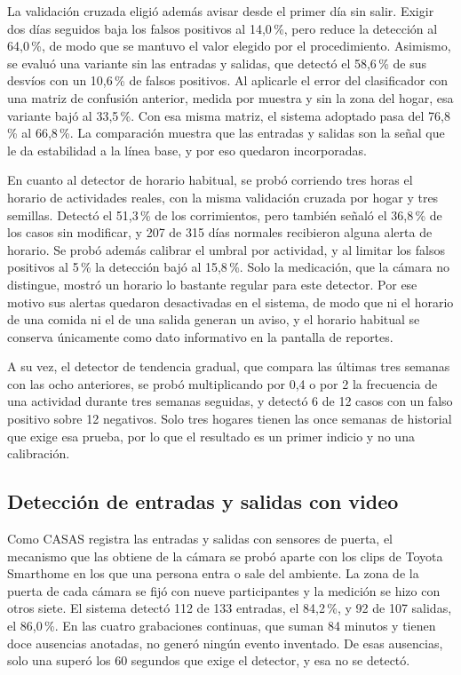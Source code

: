 La validación cruzada eligió además avisar desde el primer día sin salir.
Exigir dos días seguidos baja los falsos positivos al 14,0\,\%, pero reduce la detección al 64,0\,\%, de modo que se mantuvo el valor elegido por el procedimiento.
Asimismo, se evaluó una variante sin las entradas y salidas, que detectó el 58,6\,\% de sus desvíos con un 10,6\,\% de falsos positivos.
Al aplicarle el error del clasificador con una matriz de confusión anterior, medida por muestra y sin la zona del hogar, esa variante bajó al 33,5\,\%.
Con esa misma matriz, el sistema adoptado pasa del 76,8\,\% al 66,8\,\%.
La comparación muestra que las entradas y salidas son la señal que le da estabilidad a la línea base, y por eso quedaron incorporadas.

En cuanto al detector de horario habitual, se probó corriendo tres horas el horario de actividades reales, con la misma validación cruzada por hogar y tres semillas.
Detectó el 51,3\,\% de los corrimientos, pero también señaló el 36,8\,\% de los casos sin modificar, y 207 de 315 días normales recibieron alguna alerta de horario.
Se probó además calibrar el umbral por actividad, y al limitar los falsos positivos al 5\,\% la detección bajó al 15,8\,\%.
Solo la medicación, que la cámara no distingue, mostró un horario lo bastante regular para este detector.
Por ese motivo sus alertas quedaron desactivadas en el sistema, de modo que ni el horario de una comida ni el de una salida generan un aviso, y el horario habitual se conserva únicamente como dato informativo en la pantalla de reportes.

A su vez, el detector de tendencia gradual, que compara las últimas tres semanas con las ocho anteriores, se probó multiplicando por 0,4 o por 2 la frecuencia de una actividad durante tres semanas seguidas, y detectó 6 de 12 casos con un falso positivo sobre 12 negativos.
Solo tres hogares tienen las once semanas de historial que exige esa prueba, por lo que el resultado es un primer indicio y no una calibración.

\subsection{Detección de entradas y salidas con video}
\label{sec:pruebas_puerta}

Como CASAS registra las entradas y salidas con sensores de puerta, el mecanismo que las obtiene de la cámara se probó aparte con los clips de Toyota Smarthome en los que una persona entra o sale del ambiente.
La zona de la puerta de cada cámara se fijó con nueve participantes y la medición se hizo con otros siete.
El sistema detectó 112 de 133 entradas, el 84,2\,\%, y 92 de 107 salidas, el 86,0\,\%.
En las cuatro grabaciones continuas, que suman 84 minutos y tienen doce ausencias anotadas, no generó ningún evento inventado.
De esas ausencias, solo una superó los 60 segundos que exige el detector, y esa no se detectó.

